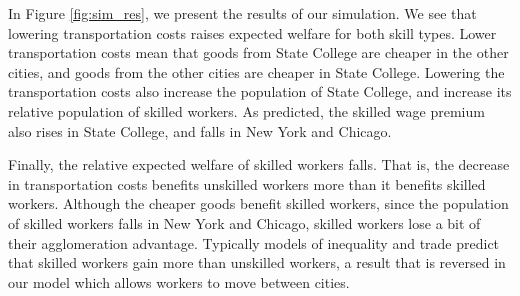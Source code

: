 \documentclass[12 pt]{article}
\begin{document}
In Figure \ref{fig:sim_res}, we present the results of our simulation.  We see that lowering transportation costs raises expected welfare for both skill types.  Lower transportation costs mean that goods from State College are cheaper in the other cities, and goods from the other cities are cheaper in State College.  Lowering the transportation costs also increase the population of State College, and increase its relative population of skilled workers.  As predicted, the skilled wage premium also rises in State College, and falls in New York and Chicago.  

Finally, the relative expected welfare of skilled workers falls.  That is, the decrease in transportation costs benefits unskilled workers more than it benefits skilled workers.  Although the cheaper goods benefit skilled workers, since the population of skilled workers falls in New York and Chicago, skilled workers lose a bit of their agglomeration advantage.  Typically models of inequality and trade predict that skilled workers gain more than unskilled workers, a result that is reversed in our model which allows workers to move between cities.
\end{document}
